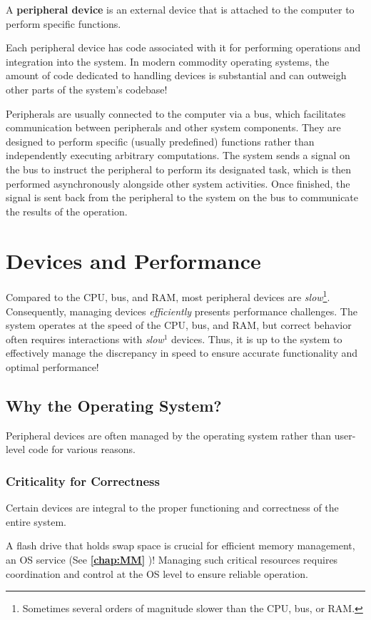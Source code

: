 \documentclass{report}
\newcommand{\definitionBegin}[1]{\begin{tcolorbox}[title={Definition: #1}]}
\newcommand{\definitionEnd}{\end{tcolorbox}}
\newcommand{\exampleBegin}[1]{\begin{tcolorbox}[colback=blue!5!white,colframe=black!75!blue,title={Example:
      #1}]}
\newcommand{\exampleEnd}{\end{tcolorbox}}
\newcommand{\refto}[2]{\textbf{\ref{#1:#2} \nameref{#1:#2}}}
\begin{document}
\definitionBegin{Peripheral Device}
A \textbf{peripheral device} is an external device that is attached to the computer to perform
specific functions.
\definitionEnd

Each peripheral device has code associated with it for performing operations and integration into
the system. In modern commodity operating systems, the amount of code dedicated to handling devices
is substantial and can outweigh other parts of the system's codebase!

Peripherals are usually connected to the computer via a bus, which facilitates communication between
peripherals and other system components. They are designed to perform specific (usually predefined)
functions rather than independently executing arbitrary computations. The system sends a signal on
the bus to instruct the peripheral to perform its designated task, which is then performed asynchronously
alongside other system activities. Once finished, the signal is sent back from the peripheral to the
system on the bus to communicate the results of the operation.

\section{Devices and Performance}
Compared to the CPU, bus, and RAM, most peripheral devices are \textit{slow}\footnote{Sometimes
  several orders of magnitude slower than the CPU, bus, or RAM.}. Consequently, managing devices
\textit{efficiently} presents performance challenges. The system operates at the speed of the CPU,
bus, and RAM, but correct behavior often requires interactions with \textit{slow}$^1$ devices. Thus,
it is up to the system to effectively manage the discrepancy in speed to ensure accurate
functionality and optimal performance!

\subsection{Why the Operating System?}
Peripheral devices are often managed by the operating system rather than user-level code for various
reasons.


\subsubsection{Criticality for Correctness}
Certain devices are integral to the proper functioning and correctness of the entire system.

\exampleBegin{Flash Drives}
A flash drive that holds swap space is crucial for efficient memory management, an OS service (See
\refto{chap}{MM})! Managing such critical resources requires coordination and control at the OS
level to ensure reliable operation.
\exampleEnd
\end{document}

